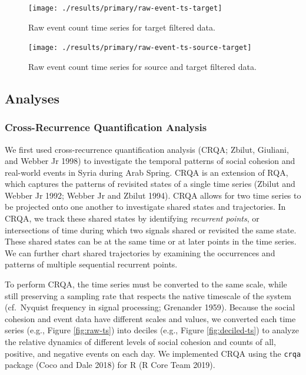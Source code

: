 \documentclass[english,man]{apa6}
\begin{document}
\begin{figure}
\texttt{[image: ./results/primary/raw-event-ts-target]} \caption{Raw event count time series for target filtered data.}\label{fig:raw-event-ts-target}
\end{figure}

\begin{figure}
\texttt{[image: ./results/primary/raw-event-ts-source-target]} \caption{Raw event count time series for source and target filtered data.}\label{fig:raw-event-ts-source-target}
\end{figure}

\hypertarget{analyses}{%
\subsection{Analyses}\label{analyses}}

\hypertarget{cross-recurrence-quantification-analysis}{%
\subsubsection{Cross-Recurrence Quantification Analysis}\label{cross-recurrence-quantification-analysis}}

We first used cross-recurrence quantification analysis (CRQA; Zbilut, Giuliani, and Webber Jr 1998) to investigate the temporal patterns of social cohesion
and real-world events in Syria during Arab Spring. CRQA is an extension of RQA,
which captures the patterns of revisited states of a single time series
(Zbilut and Webber Jr 1992; Webber Jr and Zbilut 1994). CRQA allows for two time series
to be projected onto one another to investigate shared states and trajectories.
In CRQA, we track these shared states by identifying \emph{recurrent points}, or
intersections of time during which two signals shared or revisited the same
state. These shared states can be at the same time or at later points in the
time series. We can further chart shared trajectories by examining the
occurrences and patterns of multiple sequential recurrent points.

To perform CRQA, the time series must be converted to the same scale, while
still preserving a sampling rate that respects the native timescale of the
system (cf.~Nyquist frequency in signal processing; Grenander 1959).
Because the social cohesion and event data have different scales and values, we
converted each time series (e.g., Figure \ref{fig:raw-ts}) into deciles (e.g.,
Figure \ref{fig:deciled-ts}) to analyze the relative dynamics of different
levels of social cohesion and counts of all, positive, and negative events on
each day. We implemented CRQA using the \texttt{crqa} package (Coco and Dale 2018) for R
(R Core Team 2019).
\end{document}
